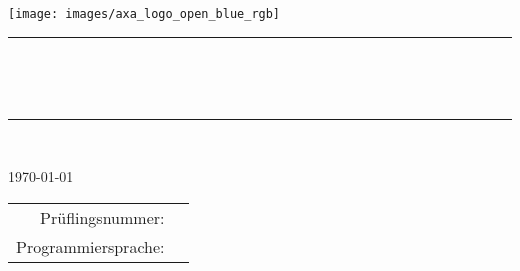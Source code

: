 \begin{titlepage}
	\thispagestyle{empty}

	\begin{flushright}
		\texttt{[image: images/axa\_logo\_open\_blue\_rgb]}
	\end{flushright}

	\vspace{1.9cm}

	\begin{center}
		\rule{0.95\textwidth}{1pt}\\[.3cm]
		\begin{minipage}{0.9\textwidth}
			\renewcommand{\baselinestretch}{1.3}
			\begin{center}
				\LARGE \textbf{\ArbeitTitelseite}
			\end{center}
		\end{minipage}\\[.3cm]
		\rule{0.95\textwidth}{1pt}\\

		\vspace{2cm}

		\today

		\vspace{2cm}

		{\large \textbf{\authorDocument}}

		\vspace{2.0cm}

		\begin{tabular}{rl}
			Prüflingsnummer: & \Pruefungsnummer\\[.3cm]
			Programmiersprache: & \Programmiersprache\\[.3cm]
		\end{tabular}

		\vspace{1.9cm}

		\clearpage
		\thispagestyle{empty}
	\end{center}
\end{titlepage}
